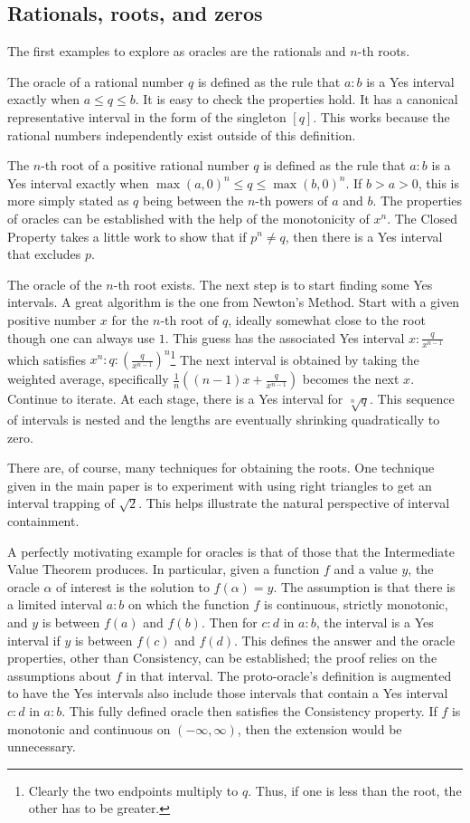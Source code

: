 \documentclass[12pt]{article}
\theoremstyle{remark}
\begin{document}
\subsection{Rationals, roots, and zeros}

The first examples to explore as oracles are the rationals and $n$-th roots. 

The oracle of a rational number $q$ is defined as the rule that $a:b$ is a Yes interval exactly when $a \leq q \leq b$. It is easy to check the properties hold. It has a canonical representative interval in the form of the singleton $[q]$. This works because the rational numbers independently exist outside of this definition. 

The $n$-th root of a positive rational number $q$ is defined as the rule that $a:b$ is a Yes interval exactly when $\max(a, 0)^n \leq q \leq \max(b,0)^n$. If $b > a> 0$, this is more simply stated as $q$ being between the $n$-th powers of $a$ and $b$. The properties of oracles can be established with the help of the monotonicity of $x^n$. The Closed Property takes a little work to show that if $p^n \neq q$, then there is a Yes interval that excludes $p$. 

The oracle of the $n$-th root exists. The next step is to start finding some Yes intervals. A great algorithm is the one from Newton's Method. Start with a given positive number $x$ for the $n$-th root of $q$, ideally somewhat close to the root though one can always use $1$. This guess has the associated Yes interval $x:\frac{q}{x^{n-1}}$ which satisfies $x^n : q : (\frac{q}{x^{n-1}})^n$\footnote{Clearly the two endpoints multiply to $q$. Thus, if one is less than the root, the other has to be greater.} The next interval is obtained by taking the weighted average, specifically $\frac{1}{n}( (n-1) x + \frac{q}{x^{n-1}} )$ becomes the next $x$. Continue to iterate. At each stage, there is a Yes interval for $\sqrt[n]{q}$. This sequence of intervals is nested and the lengths are eventually shrinking quadratically to zero.  

There are, of course, many techniques for obtaining the roots. One technique given in the main paper is to experiment with using right triangles to get an interval trapping of $\sqrt{2}$. This helps illustrate the natural perspective of interval containment.  

A perfectly motivating example for oracles is that of those that the Intermediate Value Theorem produces. In particular, given a function $f$ and a value $y$, the oracle $\alpha$ of interest is the solution to $f(\alpha) = y$. The assumption is that there is a limited interval $a:b$ on which the function $f$ is continuous, strictly monotonic, and $y$ is between $f(a)$ and $f(b)$. Then for $c:d$ in $a:b$, the interval is a Yes interval if $y$ is between $f(c)$ and $f(d)$. This defines the answer and the oracle properties, other than Consistency, can be established; the proof relies on the assumptions about $f$ in that interval. The proto-oracle's definition is augmented to have the Yes intervals also include those intervals that contain a Yes interval $c:d$ in $a:b$. This fully defined oracle then satisfies the Consistency property. If $f$ is monotonic and continuous on $(-\infty, \infty)$, then the extension would be unnecessary.  
\end{document}
